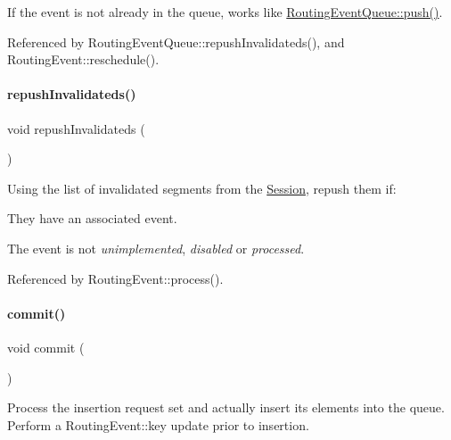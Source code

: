 If the {\ttfamily event} is not already in the queue, works like \mbox{\hyperlink{classKite_1_1RoutingEventQueue_ac802427673567526d06af911e94f7216}{Routing\+Event\+Queue\+::push()}}. 

Referenced by Routing\+Event\+Queue\+::repush\+Invalidateds(), and Routing\+Event\+::reschedule().

\mbox{\label{classKite_1_1RoutingEventQueue_a4fb0022d3e8f91a862b5f6438b7f8dad}} 
\paragraph{\texorpdfstring{repush\+Invalidateds()}{repushInvalidateds()}}
{\footnotesize\ttfamily void repush\+Invalidateds (\begin{DoxyParamCaption}{ }\end{DoxyParamCaption})}

Using the list of invalidated segments from the \mbox{\hyperlink{classKite_1_1Session}{Session}}, repush them if\+:
\begin{DoxyItemize}
\item They have an associated event.
\item The event is not {\itshape unimplemented}, {\itshape disabled} or {\itshape processed}. 
\end{DoxyItemize}

Referenced by Routing\+Event\+::process().

\mbox{\label{classKite_1_1RoutingEventQueue_ad55316f5135cdae6aa6c5a763f6c3473}} 
\paragraph{\texorpdfstring{commit()}{commit()}}
{\footnotesize\ttfamily void commit (\begin{DoxyParamCaption}{ }\end{DoxyParamCaption})}

Process the insertion request set and actually insert it\textquotesingle{}s elements into the queue. Perform a Routing\+Event\+::key update prior to insertion. 

